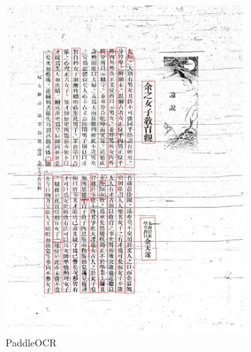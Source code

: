 \documentclass{beamer}
\begin{document}
\begin{frame}
\begin{figure}[htbp]
\begin{subfigure}[b]{0.23\linewidth}
            \includegraphics[width=\linewidth]{./figures/samples/paddle_01.jpg}
            \caption{PaddleOCR}
            \label{fig:paddle_01}
        \end{subfigure}
        \hfill
        \begin{subfigure}[b]{0.23\linewidth}

\end{subfigure}
\end{figure}
\end{frame}
\end{document}
